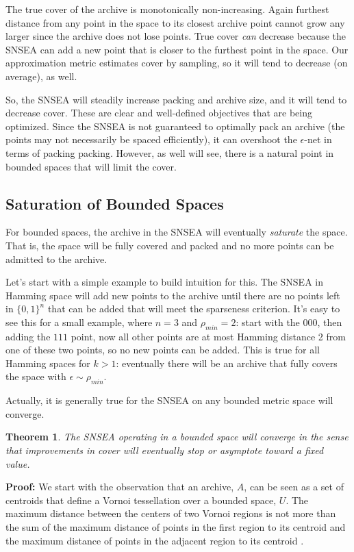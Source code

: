 \documentclass[twoside]{article}
\newtheorem{theorem}{Theorem}
\begin{document}
The true cover of the archive is monotonically non-increasing.  Again furthest distance from any point in the space to its closest archive point cannot grow any larger since the archive does not lose points.  True cover \emph{can} decrease because the SNSEA can add a new point that is closer to the furthest point in the space.  Our approximation metric estimates cover by sampling, so it will tend to decrease (on average), as well.  

So, the SNSEA will steadily increase packing and archive size, and it will tend to decrease cover.  These are clear and well-defined objectives that are being optimized.  Since the SNSEA is not guaranteed to optimally pack an archive (the points may not necessarily be spaced efficiently), it can overshoot the $\epsilon$-net in terms of packing packing.  However, as well will see, there is a natural point in bounded spaces that will limit the cover.


\subsection{Saturation of Bounded Spaces}
\label{subsec:saturation}
For bounded spaces, the archive in the SNSEA will eventually \emph{saturate} the space.  That is, the space will be fully covered and packed and no more points can be admitted to the archive.  

Let's start with a simple example to build intuition for this.  The  SNSEA in Hamming space will add new points to the archive until there are no points left in $\{0,1\}^n$ that can be added that will meet the sparseness criterion.  It's easy to see this for a small example, where $n=3$ and $\rho_{min} = 2$:  start with the $000$, then adding the $111$ point, now all other points are at most Hamming distance 2 from one of these two points, so no new points can be added.  This is true for all Hamming spaces for $k>1$:  eventually there will be an archive that fully covers the space with $\epsilon \sim \rho_{min}$.

Actually, it is generally true for the SNSEA on any bounded metric space will converge.
\begin{theorem}
The SNSEA operating in a bounded space will converge in the sense that improvements in \emph{cover} will eventually stop or asymptote toward a fixed value.
\end{theorem}
\textbf{Proof:} We start with the observation that an archive, $A$, can be seen as a set of centroids that define a Vornoi tessellation \cite{Franz1991acmcs} over a bounded space, $U$.  The maximum distance between the centers of two Vornoi regions is not more than the sum of the maximum distance of points in the first region to its centroid and the maximum distance of points in the adjacent region to its centroid \citep{Franz1991acmcs}.  
\end{document}
